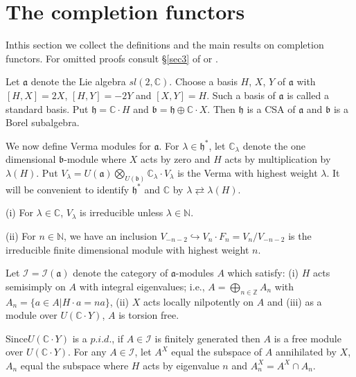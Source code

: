 
\chapter{The completion functors}\label{sec2}

In\pageoriginale this section we collect the definitions and the main
results on completion functors. For omitted proofs consult \S \ref{sec3} of
\cite{key15} or \cite{key33}.

Let $\mathfrak{a}$ denote the Lie algebra $sl(2,\mathbb{C})$. Choose a
basis $H$, $X$, $Y$ of $\mathfrak{a}$ with $[H,X] = 2X$, $[H,Y] = -
2Y$ and $[X,Y] = H$. Such a basis of $\mathfrak{a}$ is called a
standard basis. Put $\mathfrak{h} = \mathbb{C} \cdot H$ and
$\mathfrak{b} = \mathfrak{h} \oplus \mathbb{C} \cdot X$. Then
$\mathfrak{h}$ is a CSA of $\mathfrak{a}$ and $\mathfrak{b}$ is a
Borel subalgebra.

We now define Verma modules for $\mathfrak{a}$. For $\lambda \in
\mathfrak{h}^*$, let $\mathbb{C}_\lambda$ denote the one dimensional
$\mathfrak{b}$-module where $X$ acts by zero and $H$ acts by
multiplication by $\lambda(H)$. Put $V_\lambda = U(\mathfrak{a})
\bigotimes\limits_{U(\mathfrak{b})} \mathbb{C}_\lambda \cdot
V_\lambda$ is the Verma with highest weight $\lambda$. It will be
convenient to identify  $\mathfrak{h}^*$ and $\mathbb{C}$ by $\lambda
\rightleftarrows \lambda (H)$. 


\begin{prop}\label{chap2:prop2.1}%
(i) For $\lambda \in \mathbb{C}$, $V_\lambda$ is irreducible unless
  $\lambda \in \mathbb{N}$. 

\noindent
(ii) For $n \in \mathbb{N}$, we have an inclusion $V_{-n-2}
  \hookrightarrow V_n \cdot F_n = V_n / V_{-n-2}$ is the irreducible
  finite dimensional module with highest weight $n$. 
\end{prop}

\begin{definition}\label{chap2:def2.2}%
Let $\mathscr{I} = \mathscr{I}(\mathfrak{a})$ denote the category of
$\mathfrak{a}$-modules $A$ which satisfy: (i) $H$ acts semisimply on
$A$ with integral eigenvalues; i.e., $A = \bigoplus\limits_{n \in
  \mathbb{Z}} A_n$ with $A_n  = \{a \in A | H \cdot a = na\}$, (ii)
$X$ acts locally nilpotently on $A$ and (iii) as a module over
$U(\mathbb{C} \cdot Y)$, $A$ is torsion free. 
\end{definition}

Since\pageoriginale $U(\mathbb{C} \cdot Y)$ is a $p.i.d$., if $A \in
\mathscr{I}$ is finitely generated then $A$ is a free module over
$U(\mathbb{C} \cdot Y)$. For any $A \in \mathscr{I}$, let $A^X$ equal
the subspace of $A$ annihilated by $X$, $A_n$ equal the subspace where
$H$ acts by eigenvalue $n$ and $A^X_n = A^X \cap A_n$. 

